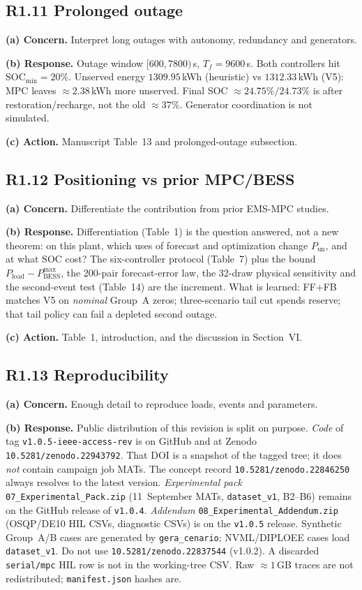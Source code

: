 \documentclass[11pt]{article}
\begin{document}
\subsection*{R1.11 Prolonged outage}
\textbf{(a) Concern.} Interpret long outages with autonomy, redundancy and generators.

\textbf{(b) Response.} Outage window $[600,7800)$\,s, $T_f=9600$\,s. Both controllers hit $\mathrm{SOC}_{\min}=20\%$. Unserved energy $1309.95$\,kWh (heuristic) vs $1312.33$\,kWh (V5): MPC leaves $\approx 2.38$\,kWh more unserved. Final SOC $\approx 24.75\%/24.73\%$ is after restoration/recharge, not the old $\approx 37\%$. Generator coordination is not simulated.

\textbf{(c) Action.} Manuscript Table~13 and prolonged-outage subsection.

\subsection*{R1.12 Positioning vs prior MPC/BESS}
\textbf{(a) Concern.} Differentiate the contribution from prior EMS-MPC studies.

\textbf{(b) Response.} Differentiation (Table~1) is the question answered, not a new theorem: on this plant, which uses of forecast and optimization change $P_{\mathrm{un}}$, and at what SOC cost? The six-controller protocol (Table~7) plus the bound $P_{\mathrm{load}}-P_{\mathrm{BESS}}^{\max}$, the 200-pair forecast-error law, the 32-draw physical sensitivity and the second-event test (Table~14) are the increment. What is learned: FF+FB matches V5 on \emph{nominal} Group~A zeros; three-scenario tail cut spends reserve; that tail policy can fail a depleted second outage.

\textbf{(c) Action.} Table~1, introduction, and the discussion in Section~VI.

\subsection*{R1.13 Reproducibility}
\textbf{(a) Concern.} Enough detail to reproduce loads, events and parameters.

\textbf{(b) Response.} Public distribution of this revision is split on purpose. \emph{Code} of tag \texttt{v1.0.5-ieee-access-rev} is on GitHub and at Zenodo \texttt{10.5281/zenodo.22943792}. That DOI is a snapshot of the tagged tree; it does \emph{not} contain campaign job MATs. The concept record \texttt{10.5281/zenodo.22846250} always resolves to the latest version. \emph{Experimental pack} \texttt{07\_Experimental\_Pack.zip} (11~September MATs, \texttt{dataset\_v1}, B2--B6) remains on the GitHub release of \texttt{v1.0.4}. \emph{Addendum} \texttt{08\_Experimental\_Addendum.zip} (OSQP/DE10 HIL CSVs, diagnostic CSVs) is on the \texttt{v1.0.5} release. Synthetic Group~A/B cases are generated by \texttt{gera\_cenario}; NVML/DIPLOEE cases load \texttt{dataset\_v1}. Do not use \texttt{10.5281/zenodo.22837544} (v1.0.2). A discarded \texttt{serial/mpc} HIL row is not in the working-tree CSV. Raw $\approx 1$\,GB traces are not redistributed; \texttt{manifest.json} hashes are.
\end{document}
